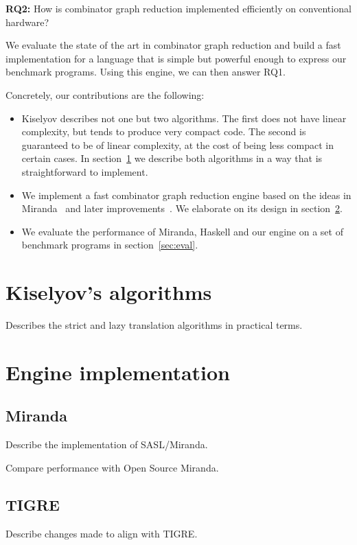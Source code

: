 \documentclass[conference]{IEEEtran}
\begin{document}
\textbf{RQ2:} How is combinator graph reduction implemented efficiently on conventional hardware?

We evaluate the state of the art in combinator graph reduction and build a fast implementation for a language that is simple but powerful enough to express our benchmark programs.
Using this engine, we can then answer RQ1.

Concretely, our contributions are the following:
\begin{itemize}
    \item Kiselyov describes not one but two algorithms. The first does not have linear complexity, but tends to produce very compact code.
          The second is guaranteed to be of linear complexity, at the cost of being less compact in certain cases.
          In section~\ref{sec:kiselyov} we describe both algorithms in a way that is straightforward to implement.
    \item We implement a fast combinator graph reduction engine based on the ideas in Miranda~\cite{turner_miranda_1985} and later improvements~\cite{koopman_architecture_1992}.
          We elaborate on its design in section~\ref{sec:engine}.
    \item We evaluate the performance of Miranda, Haskell and our engine on a set of benchmark programs in section~\ref{sec:eval}.
\end{itemize}

\section{Kiselyov's algorithms}
\label{sec:kiselyov}
Describes the strict and lazy translation algorithms in practical terms.

\section{Engine implementation}
\label{sec:engine}
\subsection*{Miranda}
Describe the implementation of SASL/Miranda.

Compare performance with Open Source Miranda.

\subsection*{TIGRE}
Describe changes made to align with TIGRE.
\end{document}
